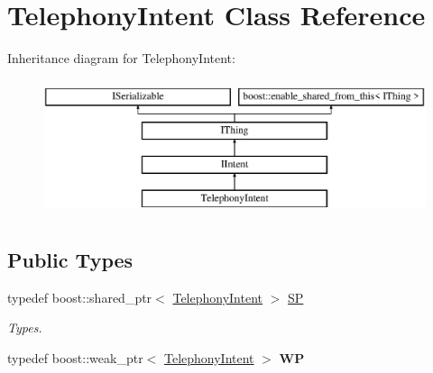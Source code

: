 \hypertarget{class_telephony_intent}{}\section{Telephony\+Intent Class Reference}
\label{class_telephony_intent}
Inheritance diagram for Telephony\+Intent\+:\begin{figure}[H]
\begin{center}
\leavevmode
\includegraphics[height=4.000000cm]{class_telephony_intent}
\end{center}
\end{figure}
\subsection*{Public Types}
\begin{DoxyCompactItemize}
\item 
\mbox{\label{class_telephony_intent_a41da962286a920f708563c617eec0d8c}} 
typedef boost\+::shared\+\_\+ptr$<$ \hyperlink{class_telephony_intent}{Telephony\+Intent} $>$ \hyperlink{class_telephony_intent_a41da962286a920f708563c617eec0d8c}{SP}
\begin{DoxyCompactList}\small\item\em Types. \end{DoxyCompactList}\item 
\mbox{\label{class_telephony_intent_ac6f2faa2acf4c90fe9055826ef0b9923}} 
typedef boost\+::weak\+\_\+ptr$<$ \hyperlink{class_telephony_intent}{Telephony\+Intent} $>$ {\bfseries WP}
\end{DoxyCompactItemize}

